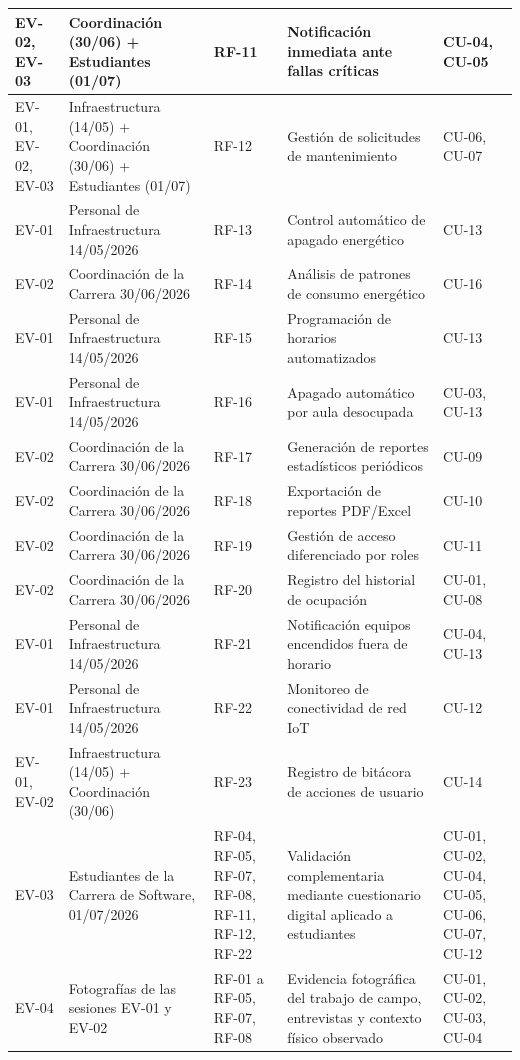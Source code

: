 \begin{longtable}{|p{3.1cm}|p{3.1cm}|p{3.1cm}|p{3.1cm}|p{3.1cm}|}
EV-02, EV-03 & Coordinación (30/06) + Estudiantes (01/07) & RF-11 & Notificación inmediata ante fallas críticas & CU-04, CU-05 \\ \hline
EV-01, EV-02, EV-03 & Infraestructura (14/05) + Coordinación (30/06) + Estudiantes (01/07) & RF-12 & Gestión de solicitudes de mantenimiento & CU-06, CU-07 \\ \hline
EV-01 & Personal de Infraestructura 14/05/2026 & RF-13 & Control automático de apagado energético & CU-13 \\ \hline
EV-02 & Coordinación de la Carrera 30/06/2026 & RF-14 & Análisis de patrones de consumo energético & CU-16 \\ \hline
EV-01 & Personal de Infraestructura 14/05/2026 & RF-15 & Programación de horarios automatizados & CU-13 \\ \hline
EV-01 & Personal de Infraestructura 14/05/2026 & RF-16 & Apagado automático por aula desocupada & CU-03, CU-13 \\ \hline
EV-02 & Coordinación de la Carrera 30/06/2026 & RF-17 & Generación de reportes estadísticos periódicos & CU-09 \\ \hline
EV-02 & Coordinación de la Carrera 30/06/2026 & RF-18 & Exportación de reportes PDF/Excel & CU-10 \\ \hline
EV-02 & Coordinación de la Carrera 30/06/2026 & RF-19 & Gestión de acceso diferenciado por roles & CU-11 \\ \hline
EV-02 & Coordinación de la Carrera 30/06/2026 & RF-20 & Registro del historial de ocupación & CU-01, CU-08 \\ \hline
EV-01 & Personal de Infraestructura 14/05/2026 & RF-21 & Notificación equipos encendidos fuera de horario & CU-04, CU-13 \\ \hline
EV-01 & Personal de Infraestructura 14/05/2026 & RF-22 & Monitoreo de conectividad de red IoT & CU-12 \\ \hline
EV-01, EV-02 & Infraestructura (14/05) + Coordinación (30/06) & RF-23 & Registro de bitácora de acciones de usuario & CU-14 \\ \hline
EV-03 & Estudiantes de la Carrera de Software, 01/07/2026 & RF-04, RF-05, RF-07, RF-08, RF-11, RF-12, RF-22 & Validación complementaria mediante cuestionario digital aplicado a estudiantes & CU-01, CU-02, CU-04, CU-05, CU-06, CU-07, CU-12 \\ \hline
EV-04 & Fotografías de las sesiones EV-01 y EV-02 & RF-01 a RF-05, RF-07, RF-08 & Evidencia fotográfica del trabajo de campo, entrevistas y contexto físico observado & CU-01, CU-02, CU-03, CU-04 \\ \hline

\end{longtable}
